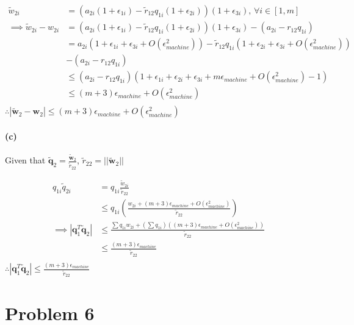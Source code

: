 \documentclass[12pt, letterpaper]{article}
\begin{document}
\begin{align*}
  \tilde{w}_{2i} &= (a_{2i}(1 + \epsilon_{1i}) - \tilde{r}_{12}q_{1i}(1+\epsilon_{2i}))(1 + \epsilon_{3i}), \, \forall i \in [1,m]\\
  \implies \tilde{w}_{2i} - w_{2i} &= (a_{2i}(1 + \epsilon_{1i}) - \tilde{r}_{12}q_{1i}(1+\epsilon_{2i}))(1 + \epsilon_{3i}) - (a_{2i} - r_{12}q_{1i})\\
                 &= a_{2i}(1 + \epsilon_{1i} + \epsilon_{3i} + O(\epsilon_{machine}^2)) - \tilde{r}_{12}q_{1i}(1+\epsilon_{2i} + \epsilon_{3i} + O(\epsilon_{machine}^2))\\
                 &- (a_{2i} - r_{12}q_{1i})\\
                 &\leq (a_{2i} - r_{12}q_{1i})(1 + \epsilon_{1i} + \epsilon_{2i} + \epsilon_{3i} + m\epsilon_{machine} + O(\epsilon_{machine}^2) - 1)\\
                 &\leq (m + 3)\epsilon_{machine} + O(\epsilon_{machine}^2)\\
\end{align*}
$\therefore \boxed{|\tilde{\mathbf{w}}_2 - \mathbf{w}_2| \leq (m + 3)\epsilon_{machine} + O(\epsilon_{machine}^2)}$

\paragraph{(c)} Given that $\tilde{\mathbf{q}}_2 = \frac{\tilde{\mathbf{w}}_2}{\tilde{r}_{22}}$, $\tilde{r}_{22} = ||\tilde{\mathbf{w}}_2||$

\begin{align*}
  q_{1i}\tilde{q}_{2i} &= q_{1i} \frac{\tilde{w}_{2i}}{\tilde{r}_{22}}\\
  &\leq q_{1i} \left(  \frac{w_{2i} + (m + 3)\epsilon_{machine} + O(\epsilon_{machine}^2)}{\tilde{r}_{22}} \right)\\
  \implies |\mathbf{q}_1^T\tilde{\mathbf{q}}_2| &\leq \frac{\sum q_{1i}w_{2i} + (\sum q_{1i})((m + 3)\epsilon_{machine} + O(\epsilon_{machine}^2))}{\tilde{r}_{22}}\\
  &\leq \frac{(m + 3)\epsilon_{machine}}{\tilde{r}_{22}}\\
\end{align*}
$\therefore \boxed{|\mathbf{q}_1^T\tilde{\mathbf{q}}_2| \leq \frac{(m + 3)\epsilon_{machine}}{\tilde{r}_{22}}}$

\pagebreak
\section*{Problem 6}
\label{sec:prob6}
\end{document}
